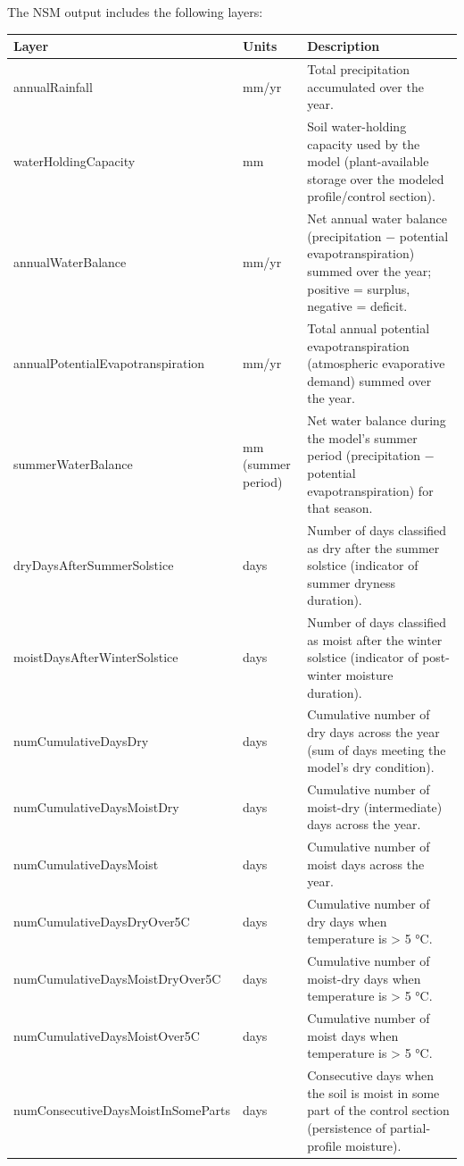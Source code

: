 \documentclass[
  10pt,
  b5paper,
  oneside]{book}
\begin{document}
The NSM output includes the following layers:

\begin{tabular}{l|l|l}
\hline
Layer & Units & Description\\
\hline
annualRainfall & mm/yr & Total precipitation accumulated over the year.\\
\hline
waterHoldingCapacity & mm & Soil water-holding capacity used by the model (plant-available storage over the modeled profile/control section).\\
\hline
annualWaterBalance & mm/yr & Net annual water balance (precipitation − potential evapotranspiration) summed over the year; positive = surplus, negative = deficit.\\
\hline
annualPotentialEvapotranspiration & mm/yr & Total annual potential evapotranspiration (atmospheric evaporative demand) summed over the year.\\
\hline
summerWaterBalance & mm (summer period) & Net water balance during the model’s summer period (precipitation − potential evapotranspiration) for that season.\\
\hline
dryDaysAfterSummerSolstice & days & Number of days classified as dry after the summer solstice (indicator of summer dryness duration).\\
\hline
moistDaysAfterWinterSolstice & days & Number of days classified as moist after the winter solstice (indicator of post-winter moisture duration).\\
\hline
numCumulativeDaysDry & days & Cumulative number of dry days across the year (sum of days meeting the model’s dry condition).\\
\hline
numCumulativeDaysMoistDry & days & Cumulative number of moist-dry (intermediate) days across the year.\\
\hline
numCumulativeDaysMoist & days & Cumulative number of moist days across the year.\\
\hline
numCumulativeDaysDryOver5C & days & Cumulative number of dry days when temperature is > 5 °C.\\
\hline
numCumulativeDaysMoistDryOver5C & days & Cumulative number of moist-dry days when temperature is > 5 °C.\\
\hline
numCumulativeDaysMoistOver5C & days & Cumulative number of moist days when temperature is > 5 °C.\\
\hline
numConsecutiveDaysMoistInSomeParts & days & Consecutive days when the soil is moist in some part of the control section (persistence of partial-profile moisture).\\

\end{tabular}
\end{document}

